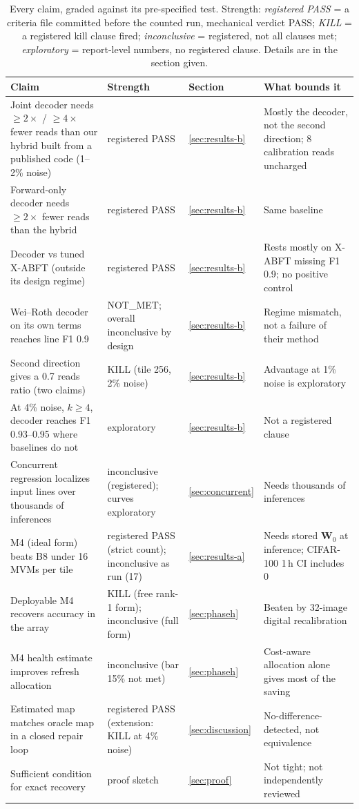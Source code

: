 \documentclass[journal]{IEEEtran}
\newcommand{\W}{\mathbf{W}}
\begin{document}
\begin{table}[t]
\caption{Every claim, graded against its pre-specified test. Strength: \emph{registered PASS} = a criteria file committed before the counted run, mechanical verdict PASS; \emph{KILL} = a registered kill clause fired; \emph{inconclusive} = registered, not all clauses met; \emph{exploratory} = report-level numbers, no registered clause. Details are in the section given.}
\label{tab:summary}
\centering\footnotesize
\begin{tabular}{p{7.0cm}p{3.2cm}p{1.3cm}p{3.5cm}}
\toprule
Claim & Strength & Section & What bounds it \\
\midrule
Joint decoder needs $\ge2\times$ / $\ge4\times$ fewer reads than our hybrid built from a published code (1--2\% noise) & registered PASS & \ref{sec:results-b} & Mostly the decoder, not the second direction; 8 calibration reads uncharged \\
Forward-only decoder needs $\ge2\times$ fewer reads than the hybrid & registered PASS & \ref{sec:results-b} & Same baseline \\
Decoder vs tuned X-ABFT (outside its design regime) & registered PASS & \ref{sec:results-b} & Rests mostly on X-ABFT missing F1 0.9; no positive control \\
Wei--Roth decoder on its own terms reaches line F1 0.9 & NOT\_MET; overall inconclusive by design & \ref{sec:results-b} & Regime mismatch, not a failure of their method \\
Second direction gives a 0.7 reads ratio (two claims) & KILL (tile 256, 2\% noise) & \ref{sec:results-b} & Advantage at 1\% noise is exploratory \\
At 4\% noise, $k\ge4$, decoder reaches F1 0.93--0.95 where baselines do not & exploratory & \ref{sec:results-b} & Not a registered clause \\
Concurrent regression localizes input lines over thousands of inferences & inconclusive (registered); curves exploratory & \ref{sec:concurrent} & Needs thousands of inferences \\
M4 (ideal form) beats B8 under 16 MVMs per tile & registered PASS (strict count); inconclusive as run (17) & \ref{sec:results-a} & Needs stored $\W_0$ at inference; CIFAR-100 1\,h CI includes 0 \\
Deployable M4 recovers accuracy in the array & KILL (free rank-1 form); inconclusive (full form) & \ref{sec:phaseh} & Beaten by 32-image digital recalibration \\
M4 health estimate improves refresh allocation & inconclusive (bar 15\% not met) & \ref{sec:phaseh} & Cost-aware allocation alone gives most of the saving \\
Estimated map matches oracle map in a closed repair loop & registered PASS (extension: KILL at 4\% noise) & \ref{sec:discussion} & No-difference-detected, not equivalence \\
Sufficient condition for exact recovery & proof sketch & \ref{sec:proof} & Not tight; not independently reviewed \\
\bottomrule
\end{tabular}
\end{table}
\end{document}
